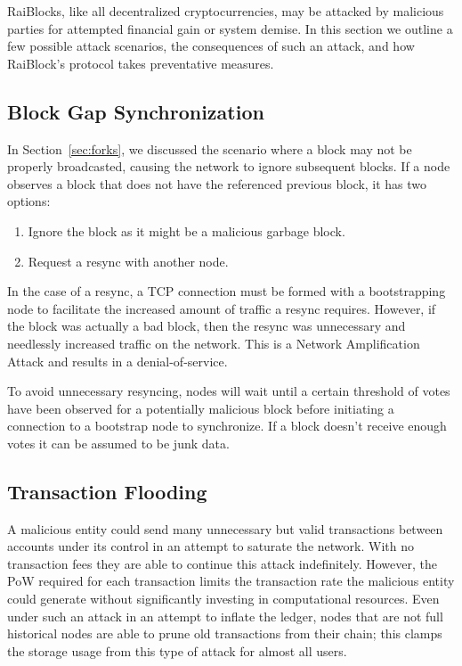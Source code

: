 RaiBlocks, like all decentralized cryptocurrencies, may be attacked by malicious parties for attempted financial gain or system demise. In this section we outline a few possible attack scenarios, the consequences of such an attack, and how RaiBlock's protocol takes preventative measures.

\subsection{Block Gap Synchronization}
In Section~\ref{sec:forks}, we discussed the scenario where a block may not be properly broadcasted, causing the network to ignore subsequent blocks. If a node observes a block that does not have the referenced previous block, it has two options:
\begin{enumerate}
  \item Ignore the block as it might be a malicious garbage block.
  \item Request a resync with another node.
\end{enumerate}
In the case of a resync, a TCP connection must be formed with a bootstrapping node to facilitate the increased amount of traffic a resync requires. However, if the block was actually a bad block, then the resync was unnecessary and needlessly increased traffic on the network. This is a Network Amplification Attack and results in a denial-of-service.

To avoid unnecessary resyncing, nodes will wait until a certain threshold of votes have been observed for a potentially malicious block before initiating a connection to a bootstrap node to synchronize. If a block doesn't receive enough votes it can be assumed to be junk data.

\subsection{Transaction Flooding}\label{sec:transaction_flooding}
A malicious entity could send many unnecessary but valid transactions between accounts under its control in an attempt to saturate the network. With no transaction fees they are able to continue this attack indefinitely. However, the PoW required for each transaction limits the transaction rate the malicious entity could generate without significantly investing in computational resources. Even under such an attack in an attempt to inflate the ledger, nodes that are not full historical nodes are able to prune old transactions from their chain; this clamps the storage usage from this type of attack for almost all users.

